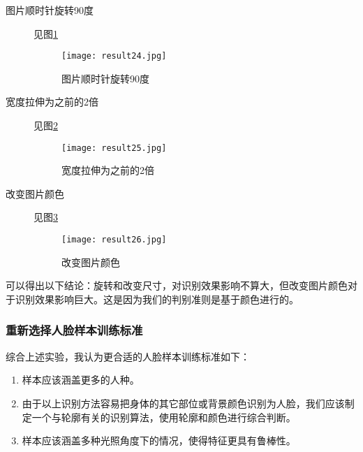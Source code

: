 \documentclass[a4paper]{article}
\begin{document}
\begin{description}
    \item [图片顺时针旋转90度] 见图\ref{fig:result 24}
\begin{figure}[ht]
    \centering
    \texttt{[image: result24.jpg]}
    \caption{图片顺时针旋转90度}
    \label{fig:result 24}
\end{figure}
    \item [宽度拉伸为之前的2倍] 见图\ref{fig:result 25}
\begin{figure}[ht]
    \centering
    \texttt{[image: result25.jpg]}
    \caption{宽度拉伸为之前的2倍}
    \label{fig:result 25}
\end{figure}
    \item [改变图片颜色] 见图\ref{fig:result 26}
\begin{figure}[ht]
    \centering
    \texttt{[image: result26.jpg]}
    \caption{改变图片颜色}
    \label{fig:result 26}
\end{figure}
\end{description}

\par 可以得出以下结论：旋转和改变尺寸，对识别效果影响不算大，但改变图片颜色对于识别效果影响巨大。这是因为我们的判别准则是基于颜色进行的。

\subsubsection{重新选择人脸样本训练标准}

\par 综合上述实验，我认为更合适的人脸样本训练标准如下：
\begin{enumerate}
    \item 样本应该涵盖更多的人种。
    \item 由于以上识别方法容易把身体的其它部位或背景颜色识别为人脸，我们应该制定一个与轮廓有关的识别算法，使用轮廓和颜色进行综合判断。
    \item 样本应该涵盖多种光照角度下的情况，使得特征更具有鲁棒性。
\end{enumerate}
\end{document}
